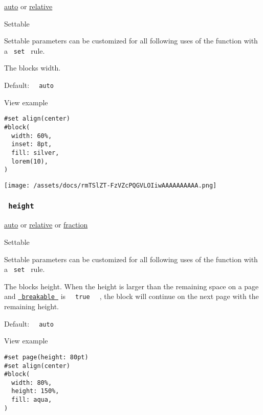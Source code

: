 \href{/docs/reference/foundations/auto/}{auto} {or}
\href{/docs/reference/layout/relative/}{relative}

{{ Settable }}

\label{parameters-width-settable-tooltip}
Settable parameters can be customized for all following uses of the
function with a \texttt{\ set\ } rule.

The block\textquotesingle s width.

Default: \texttt{\ }{\texttt{\ auto\ }}\texttt{\ }


View example

\begin{verbatim}
#set align(center)
#block(
  width: 60%,
  inset: 8pt,
  fill: silver,
  lorem(10),
)
\end{verbatim}

\texttt{[image: /assets/docs/rmTSlZT-FzVZcPQGVLOIiwAAAAAAAAAA.png]}

\subsubsection{\texorpdfstring{\texttt{\ height\ }}{ height }}\label{parameters-height}

\href{/docs/reference/foundations/auto/}{auto} {or}
\href{/docs/reference/layout/relative/}{relative} {or}
\href{/docs/reference/layout/fraction/}{fraction}

{{ Settable }}

\label{parameters-height-settable-tooltip}
Settable parameters can be customized for all following uses of the
function with a \texttt{\ set\ } rule.

The block\textquotesingle s height. When the height is larger than the
remaining space on a page and
\href{/docs/reference/layout/block/\#parameters-breakable}{\texttt{\ breakable\ }}
is \texttt{\ }{\texttt{\ true\ }}\texttt{\ } , the block will continue
on the next page with the remaining height.

Default: \texttt{\ }{\texttt{\ auto\ }}\texttt{\ }


View example

\begin{verbatim}
#set page(height: 80pt)
#set align(center)
#block(
  width: 80%,
  height: 150%,
  fill: aqua,
)
\end{verbatim}

